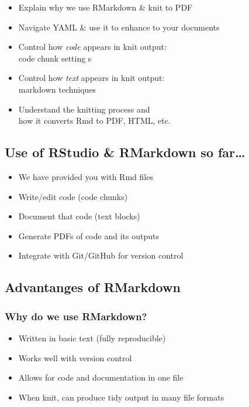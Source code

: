 \documentclass[
]{article}
\providecommand{\tightlist}{%
  \setlength{\itemsep}{0pt}\setlength{\parskip}{0pt}}
\begin{document}
\begin{itemize}
\tightlist
\item
  Explain why we use RMarkdown \& knit to PDF
\item
  Navigate YAML \& use it to enhance to your documents
\item
  Control how \emph{code} appears in knit output:\\
  code chunk setting s
\item
  Control how \emph{text} appears in knit output:\\
  markdown techniques
\item
  Understand the knitting process and\\
  how it converts Rmd to PDF, HTML, etc.
\end{itemize}

\subsection{Use of RStudio \& RMarkdown so
far\ldots{}}\label{use-of-rstudio-rmarkdown-so-far}

\begin{itemize}
\tightlist
\item
  We have provided you with Rmd files
\item
  Write/edit code (code chunks)
\item
  Document that code (text blocks)
\item
  Generate PDFs of code and its outputs
\item
  Integrate with Git/GitHub for version control
\end{itemize}

\subsection{Advantanges of RMarkdown}\label{advantanges-of-rmarkdown}

\subsubsection{Why do we use RMarkdown?}\label{why-do-we-use-rmarkdown}

\begin{itemize}
\tightlist
\item
  Written in basic text (fully reproducible)
\item
  Works well with version control
\item
  Allows for code and documentation in one file
\item
  When knit, can produce tidy output in many file formats
\end{itemize}
\end{document}
